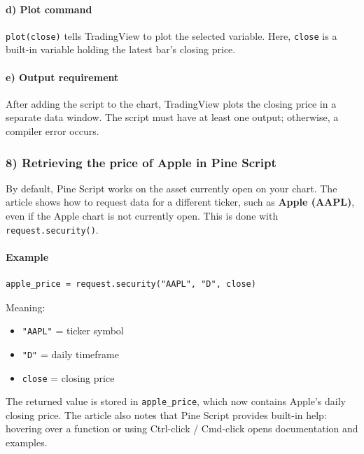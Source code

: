 \documentclass[12pt,openany]{book}
\begin{document}
\paragraph{d) Plot command}

\texttt{plot(close)} tells TradingView to plot the selected variable. Here, \texttt{close} is a built-in variable holding the latest bar's closing price.

\paragraph{e) Output requirement}

After adding the script to the chart, TradingView plots the closing price in a separate data window. The script must have at least one output; otherwise, a compiler error occurs.

\subsubsection{8) Retrieving the price of Apple in Pine Script}

By default, Pine Script works on the asset currently open on your chart. The article shows how to request data for a different ticker, such as \textbf{Apple (AAPL)}, even if the Apple chart is not currently open. This is done with \texttt{request.security()}.

\paragraph{Example}

\begin{Verbatim}[breaklines=true,breakanywhere=true,fontsize=\small]
apple_price = request.security("AAPL", "D", close)
\end{Verbatim}

Meaning:

\begin{itemize}[leftmargin=*]
    \item \texttt{"AAPL"} = ticker symbol
    \item \texttt{"D"} = daily timeframe
    \item \texttt{close} = closing price
\end{itemize}

The returned value is stored in \texttt{apple\_price}, which now contains Apple's daily closing price. The article also notes that Pine Script provides built-in help: hovering over a function or using Ctrl-click / Cmd-click opens documentation and examples.
\end{document}
